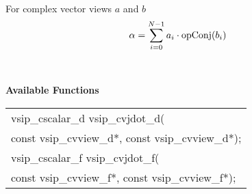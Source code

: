 \\ \hspace*{.8cm}For complex vector views $a$ and $b$
\begin{equation*}
\alpha = \sum \limits_{i=0}^{N-1} a_i \cdot \operatorname{opConj}(b_i)
\end{equation*}
\\\cvsiplh
\\ \hspace*{.8cm} \vspace*{.1cm} \textbf{Available Functions }
\\ \hspace*{0.03\textwidth} {
\ttfamily
\begin{tabular}[H]{l}
vsip\_cscalar\_d vsip\_cvjdot\_d(\\*\hspace{.6cm}const vsip\_cvview\_d*, const vsip\_cvview\_d*);\\
vsip\_cscalar\_f vsip\_cvjdot\_f(\\*\hspace{.6cm}const vsip\_cvview\_f*, const vsip\_cvview\_f*);\\
\end{tabular}
}
\\\pyjvsiph
{}
